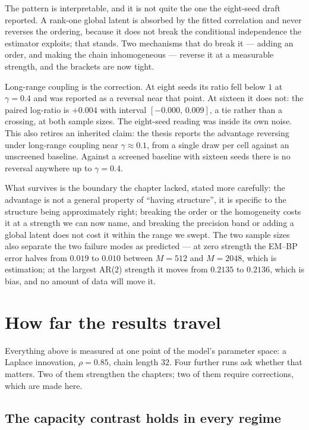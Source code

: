 \documentclass[11pt,a4paper]{article}
\begin{document}
The pattern is interpretable, and it is not quite the one the eight-seed draft reported. A
rank-one global latent is absorbed by the fitted correlation and never reverses the ordering,
because it does not break the conditional independence the estimator exploits; that stands. Two
mechanisms that do break it --- adding an order, and making the chain inhomogeneous --- reverse it
at a measurable strength, and the brackets are now tight.

Long-range coupling is the correction. At eight seeds its ratio fell below $1$ at
$\gamma=0.4$ and was reported as a reversal near that point. At sixteen it does not: the paired
log-ratio is $+0.004$ with interval $[-0.000,\,0.009]$, a tie rather than a crossing, at both
sample sizes. The eight-seed reading was inside its own noise. This also retires an inherited
claim: the thesis reports the advantage reversing under long-range coupling near $\gamma\approx
0.1$, from a single draw per cell against an unscreened baseline. Against a screened baseline with
sixteen seeds there is no reversal anywhere up to $\gamma=0.4$.

What survives is the boundary the chapter lacked, stated more carefully: the advantage is not a
general property of ``having structure'', it is specific to the structure being approximately
right; breaking the order or the homogeneity costs it at a strength we can now name, and breaking
the precision band or adding a global latent does not cost it within the range we swept. The two
sample sizes also separate the two failure modes as predicted --- at zero strength the EM--BP error
halves from $0.019$ to $0.010$ between $M=512$ and $M=2048$, which is estimation; at the largest
AR(2) strength it moves from $0.2135$ to $0.2136$, which is bias, and no amount of data will move
it.

\section{How far the results travel}\label{sec:robust}

Everything above is measured at one point of the model's parameter space: a Laplace innovation,
$\rho=0.85$, chain length $32$. Four further runs ask whether that matters. Two of them strengthen
the chapters; two of them require corrections, which are made here.

\subsection{The capacity contrast holds in every regime}\label{sec:regimes}
\end{document}
